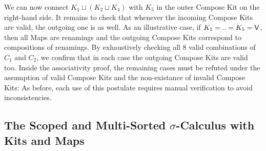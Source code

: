 \documentclass[screen,nonacm]{acmart}
\begin{document}
We can now connect $K_1 \sqcup (K_2 \sqcup K_4)$ with $K_5$ in the outer
Compose Kit on the right-hand side. It remains to check that whenever the
incoming Compose Kits are valid, the outgoing one is as well. As an
illustrative case, if $K_1 = .. = K_5 = \AgdaFunction{V}$, then all Maps are
renamings and the outgoing Compose Kits correspond to compositions of
renamings. By exhaustively checking all $8$ valid combinations of $C_1$ and
$C_2$, we confirm that in each case the outgoing Compose Kits are valid too.
Inside the associativity proof, the remaining cases must be refuted under the
assumption of valid Compose Kits and the non-existance of invalid Compose Kits:
\AUnqiueCKitsImp{} As before, each use of this postulate requires manual
verification to avoid inconsistencies.

\subsection{The Scoped and Multi-Sorted $\sigma$-Calculus with Kits and Maps}\label{sec:ags-rls}
\end{document}
